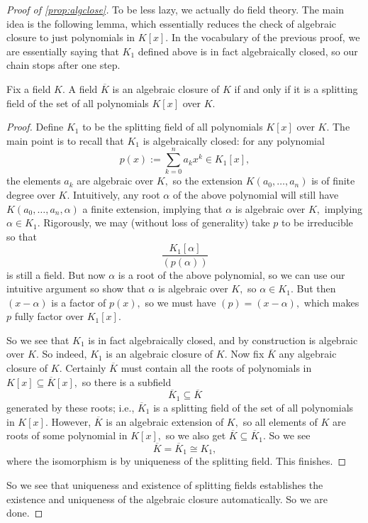 \documentclass[../notes.tex]{subfiles}
\begin{document}
\begin{proof}[Proof of \autoref{prop:algclose}]
	To be less lazy, we actually do field theory. The main idea is the following lemma, which essentially reduces the check of algebraic closure to just polynomials in $K[x].$ In the vocabulary of the previous proof, we are essentially saying that $K_1$ defined above is in fact algebraically closed, so our chain stops after one step.
	\begin{lemma}
		Fix a field $K.$ A field $\overline K$ is an algebraic closure of $K$ if and only if it is a splitting field of the set of all polynomials $K[x]$ over $K.$
	\end{lemma}
	\begin{proof}
		Define $K_1$ to be the splitting field of all polynomials $K[x]$ over $K.$ The main point is to recall that $K_1$ is algebraically closed: for any polynomial
		\[p(x):=\sum_{k=0}^na_kx^k\in K_1[x],\]
		the elements $a_k$ are algebraic over $K,$ so the extension $K(a_0,\ldots,a_n)$ is of finite degree over $K.$ Intuitively, any root $\alpha$ of the above polynomial will still have $K(a_0,\ldots,a_n,\alpha)$ a finite extension, implying that $\alpha$ is algebraic over $K,$ implying $\alpha\in K_1.$ Rigorously, we may (without loss of generality) take $p$ to be irreducible so that
		\[\frac{K_1[\alpha]}{(p(\alpha))}\]
		is still a field. But now $\alpha$ is a root of the above polynomial, so we can use our intuitive argument so show that $\alpha$ is algebraic over $K,$ so $\alpha\in K_1.$ But then $(x-\alpha)$ is a factor of $p(x),$ so we must have $(p)=(x-\alpha),$ which makes $p$ fully factor over $K_1[x].$

		So we see that $K_1$ is in fact algebraically closed, and by construction is algebraic over $K.$ So indeed, $K_1$ is an algebraic closure of $K.$ Now fix $\overline K$ any algebraic closure of $K.$ Certainly $\overline K$ must contain all the roots of polynomials in $K[x]\subseteq\overline K[x],$ so there is a subfield
		\[\overline K_1\subseteq\overline K\]
		generated by these roots; i.e., $\overline K_1$ is a splitting field of the set of all polynomials in $K[x].$ However, $\overline K$ is an algebraic extension of $K,$ so all elements of $K$ are roots of some polynomial in $K[x],$ so we also get $\overline K\subseteq\overline K_1.$ So we see
		\[\overline K=\overline K_1\cong K_1,\]
		where the isomorphism is by uniqueness of the splitting field. This finishes.
	\end{proof}
	So we see that uniqueness and existence of splitting fields establishes the existence and uniqueness of the algebraic closure automatically. So we are done.
\end{proof}
\end{document}
